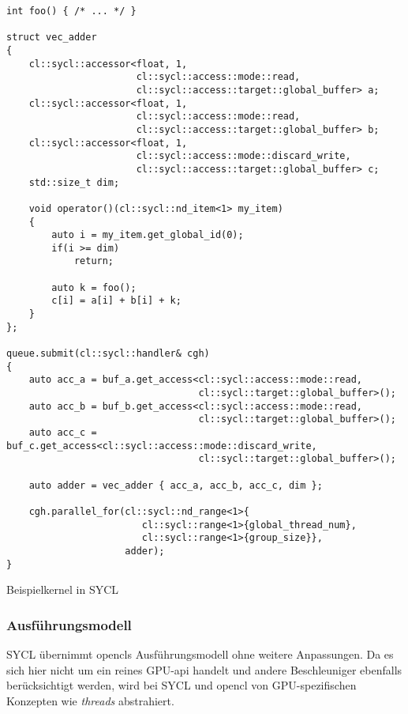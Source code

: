 \begin{code}
    \begin{verbatim}
int foo() { /* ... */ }

struct vec_adder
{
    cl::sycl::accessor<float, 1,
                       cl::sycl::access::mode::read,
                       cl::sycl::access::target::global_buffer> a;
    cl::sycl::accessor<float, 1,
                       cl::sycl::access::mode::read,
                       cl::sycl::access::target::global_buffer> b;
    cl::sycl::accessor<float, 1,
                       cl::sycl::access::mode::discard_write,
                       cl::sycl::access::target::global_buffer> c;
    std::size_t dim;

    void operator()(cl::sycl::nd_item<1> my_item)
    {
        auto i = my_item.get_global_id(0);
        if(i >= dim)
            return;

        auto k = foo();
        c[i] = a[i] + b[i] + k;
    }
};

queue.submit(cl::sycl::handler& cgh)
{
    auto acc_a = buf_a.get_access<cl::sycl::access::mode::read,
                                  cl::sycl::target::global_buffer>();
    auto acc_b = buf_b.get_access<cl::sycl::access::mode::read,
                                  cl::sycl::target::global_buffer>();
    auto acc_c = buf_c.get_access<cl::sycl::access::mode::discard_write,
                                  cl::sycl::target::global_buffer>();

    auto adder = vec_adder { acc_a, acc_b, acc_c, dim };

    cgh.parallel_for(cl::sycl::nd_range<1>{
                        cl::sycl::range<1>{global_thread_num},
                        cl::sycl::range<1>{group_size}},
                     adder);
}
    \end{verbatim}
    \caption{Beispielkernel in SYCL}
    \label{vergleich:sycl:einfuehrung:vecadd}
\end{code}

\subsubsection{Ausführungsmodell}

SYCL übernimmt \gls{opencl}s Ausführungsmodell ohne weitere Anpassungen. Da es
sich hier nicht um ein reines GPU-\gls{api} handelt und andere Beschleuniger
ebenfalls berücksichtigt werden, wird bei SYCL und \gls{opencl} von
GPU-spezifischen Konzepten wie \textit{threads} abstrahiert.

